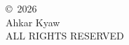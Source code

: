 \clearpage
\thispagestyle{plain}
\null
\vfill
\begin{center}
\copyright\ 2026\\
Ahkar Kyaw\\
ALL RIGHTS RESERVED
\end{center}
\vspace{1\baselineskip}
\null